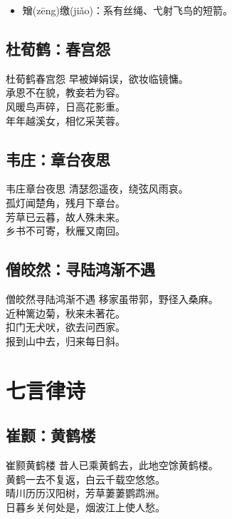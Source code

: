\documentclass[12pt,oneside,a5paper]{book}
\begin{document}
\begin{itemize}
\item 矰(zēng)缴(jiǎo)：系有丝绳、弋射飞鸟的短箭。
\end{itemize}

\chapter{杜荀鹤：春宫怨}
\begin{poemzh}{杜荀鹤}{春宫怨}
早被婵娟误，欲妆临镜慵。\\
承恩不在貌，教妾若为容。\\
风暖鸟声碎，日高花影重。\\
年年越溪女，相忆采芙蓉。\\ 
\end{poemzh}

\chapter{韦庄：章台夜思}
\begin{poemzh}{韦庄}{章台夜思}
清瑟怨遥夜，绕弦风雨哀。\\
孤灯闻楚角，残月下章台。\\
芳草已云暮，故人殊未来。\\
乡书不可寄，秋雁又南回。\\ 
\end{poemzh}

\chapter{僧皎然：寻陆鸿渐不遇}
\begin{poemzh}{僧皎然}{寻陆鸿渐不遇}
移家虽带郭，野径入桑麻。\\
近种篱边菊，秋来未著花。\\
扣门无犬吠，欲去问西家。\\
报到山中去，归来每日斜。\\ 
\end{poemzh}


\part{七言律诗}
\chapter{崔颢：黄鹤楼}
\begin{poemzh}{崔颢}{黄鹤楼}
昔人已乘黄鹤去，此地空馀黄鹤楼。\\
黄鹤一去不复返，白云千载空悠悠。\\
晴川历历汉阳树，芳草萋萋鹦鹉洲。\\
日暮乡关何处是，烟波江上使人愁。\\ 
\end{poemzh}
\end{document}
